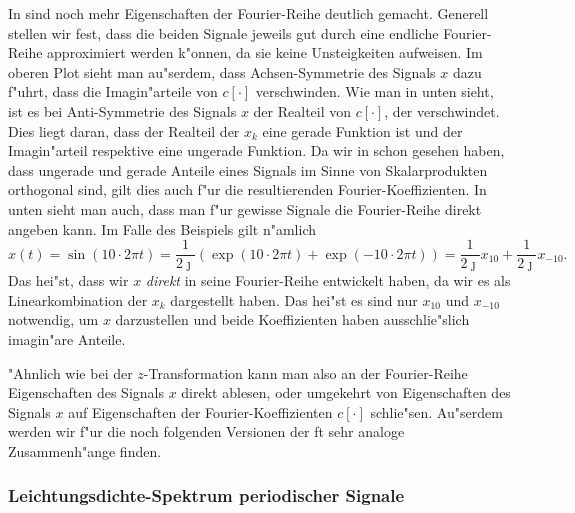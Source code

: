 In  sind noch mehr Eigenschaften der Fourier-Reihe deutlich gemacht.
Generell stellen wir fest, dass die beiden Signale jeweils gut durch eine endliche Fourier-Reihe approximiert werden k"onnen, da sie keine Unsteigkeiten aufweisen.
Im oberen Plot sieht man au"serdem, dass Achsen-Symmetrie des Signals $x$ dazu f"uhrt, dass die Imagin"arteile von $c[\cdot]$ verschwinden.
Wie man in  unten sieht, ist es bei Anti-Symmetrie des Signals $x$ der Realteil von $c[\cdot]$, der verschwindet.
Dies liegt daran, dass der Realteil der $x_k$ eine gerade Funktion ist und der Imagin"arteil respektive eine ungerade Funktion.
Da wir in  schon gesehen haben, dass ungerade und gerade Anteile eines Signals im Sinne von Skalarprodukten orthogonal sind, gilt dies auch f"ur die resultierenden Fourier-Koeffizienten.
In  unten sieht man auch, dass man f"ur gewisse Signale die Fourier-Reihe direkt angeben kann.
Im Falle des Beispiels gilt n"amlich
\[
x(t) 
    = \sin(10 \cdot 2 \pi t) 
    = \frac{1}{2 \jmath} \left(
        \exp(10 \cdot 2 \pi t) + \exp(-10 \cdot 2 \pi t)
    \right) 
    = \frac{1}{2 \jmath} x_{10} + \frac{1}{2 \jmath} x_{-10}.
\]
Das hei"st, dass wir $x$ \emph{direkt} in seine Fourier-Reihe entwickelt haben, da wir es als Linearkombination der $x_k$ dargestellt haben.
Das hei"st es sind nur $x_{10}$ und $x_{-10}$ notwendig, um $x$ darzustellen und beide Koeffizienten haben ausschlie"slich imagin"are Anteile.

"Ahnlich wie bei der $z$-Transformation kann man also an der Fourier-Reihe Eigenschaften des Signals $x$ direkt ablesen, oder umgekehrt von Eigenschaften des Signals $x$ auf Eigenschaften der Fourier-Koeffizienten $c[\cdot]$ schlie"sen.
Au"serdem werden wir f"ur die noch folgenden Versionen der \gls{ft} sehr analoge Zusammenh"ange finden.

\subsubsection{Leichtungsdichte-Spektrum periodischer Signale}

